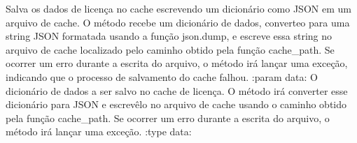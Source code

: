 \documentclass[letterpaper,10pt,english]{sphinxmanual}
\begin{document}

\begin{fulllineitems}
\label{\detokenize{api/online_license:online_license.save_cache}}
\pysigstartsignatures
\pysiglinewithargsret
{}
{}
{}
\pysigstopsignatures
\sphinxAtStartPar
Salva os dados de licença no cache escrevendo um dicionário como JSON em um arquivo de cache. O método recebe um dicionário de dados, converte\sphinxhyphen{}o para uma string JSON formatada usando a função json.dump, e escreve essa string no arquivo de cache localizado pelo caminho obtido pela função cache\_path. Se ocorrer um erro durante a escrita do arquivo, o método irá lançar uma exceção, indicando que o processo de salvamento do cache falhou.
:param data: O dicionário de dados a ser salvo no cache de licença. O método irá converter esse dicionário para JSON e escrevê\sphinxhyphen{}lo no arquivo de cache usando o caminho obtido pela função cache\_path. Se ocorrer um erro durante a escrita do arquivo, o método irá lançar uma exceção.
:type data: 
\begin{quote}\begin{description}
\sphinxAtStartPar
{}

\end{description}\end{quote}

\end{fulllineitems}

\end{document}
